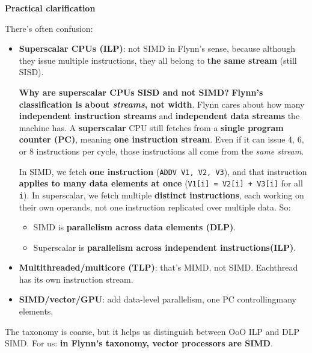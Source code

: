 \highspace
\begin{flushleft}
    \textcolor{Red2}{ \textbf{Practical clarification}}
\end{flushleft}
There's often confusion:
\begin{itemize}
    \item \textbf{Superscalar CPUs (ILP)}: not SIMD in Flynn's sense, because although they issue multiple instructions, they all belong to \textbf{the same stream} (still SISD).

    \textcolor{Green3}{ \textbf{Why are superscalar CPUs SISD and not SIMD?}} \textbf{Flynn's classification is about \emph{streams}, not width}. Flynn cares about how many \textbf{independent instruction streams} and \textbf{independent data streams} the machine has. A \textbf{superscalar} CPU still fetches from a \textbf{single program counter (PC)}, meaning \textbf{one instruction stream}. Even if it can issue 4, 6, or 8 instructions per cycle, those instructions all come from the \emph{same stream}.

    \highspace
    In SIMD, we fetch \textbf{one instruction} (\texttt{ADDV V1, V2, V3}), and that instruction \textbf{applies to many data elements at once} (\texttt{V1[i] = V2[i] + V3[i]} for all \texttt{i}). In superscalar, we fetch multiple \textbf{distinct instructions}, each working on their own operands, not one instruction replicated over multiple data. So:
    \begin{itemize}
        \item SIMD is \textbf{parallelism across data elements (DLP)}.
        \item Superscalar is \textbf{parallelism across independent instructions\break (ILP)}.
    \end{itemize}
    \item \textbf{Multithreaded/multicore (TLP)}: that's MIMD, not SIMD. Each\break thread has its own instruction stream.
    \item \textbf{SIMD/vector/GPU}: add data-level parallelism, one PC controlling\break many elements.
\end{itemize}
The taxonomy is coarse, but it helps us distinguish between OoO ILP and DLP SIMD. For us: \textbf{in Flynn's taxonomy, vector processors are SIMD}.